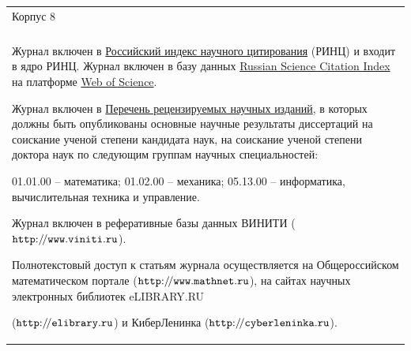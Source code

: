 \begin{table}[h!]
\begin{center}
\begin{tabular}{p{6.5cm}p{6.5cm}}
{\par Корпус 8 }

\\

&

\\

\multicolumn{2}{p{13cm}}{\footnotesize







Журнал включен в \href{http://elibrary.ru/projects/citation/cit_index.asp}{Российский индекс научного цитирования} (РИНЦ) и входит в ядро РИНЦ. Журнал включен в базу данных \href{http://elibrary.ru/rsci_about.asp}{Russian Science Citation Index} на платформе \href{http://wokinfo.com/products_tools/multidisciplinary/rsci/}{Web of Science}.



\smallskip



Журнал включен в  \href{http://vak.ed.gov.ru/87}{Перечень рецензируемых научных изданий}, в которых должны быть опубликованы основные научные результаты диссертаций на соискание ученой степени кандидата наук, на соискание ученой степени доктора наук по следующим группам научных специальностей:

01.01.00  – математика; 01.02.00  – механика; 05.13.00  – информатика,  вычислительная техника и  управление.



\smallskip





Журнал включен в реферативные базы данных ВИНИТИ (\href{http://www.viniti.ru}{$\tt http{:}{/\!/}www.viniti.ru$}).%



\smallskip



Полнотекстовый доступ к статьям журнала осуществляется на Общероссийском математическом портале (\href{http://goo.gl/EeAvfJ}{$\tt http{:}{/\!/}www.mathnet.ru$}), на сайтах научных электронных библиотек eLIBRARY.RU

(\href{http://elibrary.ru/title_about.asp?id=5784}{$\tt http{:}{/\!/}elibrary.ru$}) и КиберЛенинка (\href{http://cyberleninka.ru/journal/n/vestnik-samarskogo-gosudarstvennogo-tehnicheskogo-universiteta-seriya-fiziko-matematicheskie-nauki}{$\tt http{:}{/\!/}cyberleninka.ru$}).



}
\end{tabular}
\end{center}
\end{table}
